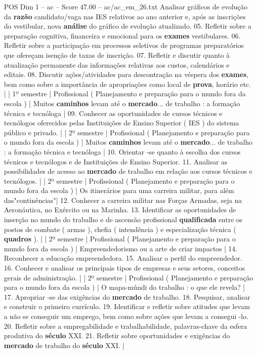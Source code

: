 \begin{textsample}{POS Dim 1 – ac – Score 47.00 – ac/ac\_em\_26.txt}
Analisar gráficos de evolução da \textbf{razão} candidato/vaga nas IES relativos ao ano anterior e, após as inscrições do vestibular, nova \textbf{análise} do gráfico de evolução atualizado. 05.
Refletir sobre a preparação cognitiva, financeira e emocional para os \textbf{exames} vestibulares. 06.
Refletir sobre a participação em processos seletivos de programas preparatórios que ofereçam isenção de taxas de inscrição. 07.
Refletir e discutir quanto à atualização permanente das informações relativas aos custos, calendários e editais. 08.
Discutir ações/atividades para descontração na véspera dos \textbf{exames}, bem como sobre a importância de apropriações como local de \textbf{prova}, horário etc. | | 1º semestre | Profissional ( Planejamento e preparação para o mundo fora da escola ) | Muitos \textbf{caminhos} levam até o \textbf{mercado}... de trabalho : a formação técnica e tecnóloga | 09.
Conhecer as oportunidades de cursos técnicos e tecnólogos oferecidos pelas Instituições de Ensino Superior ( IES ) do sistema público e privado. | | 2º semestre | Profissional ( Planejamento e preparação para o mundo fora da escola ) | Muitos \textbf{caminhos} levam até o \textbf{mercado}... de trabalho : a formação técnica e tecnóloga | 10.
Orientar -se quanto à escolha dos cursos técnicos e tecnólogos e de Instituições de Ensino Superior. 11.
Analisar as possibilidades de acesso ao \textbf{mercado} de trabalho em relação aos cursos técnicos e tecnólogos. | | 2º semestre | Profissional ( Planejamento e preparação para o mundo fora da escola ) | Os itinerários para uma carreira militar, para além das"continências"| 12.
Conhecer a carreira militar nas Forças Armadas, seja na Aeronáutica, no Exército ou na Marinha. 13.
Identificar as oportunidades de inserção no mundo do trabalho e de ascensão profissional \textbf{qualificada} entre os postos de combate ( armas ), chefia ( intendência ) e especialização técnica ( \textbf{quadros} ). | | 2º semestre | Profissional ( Planejamento e preparação para o mundo fora da escola ) | Empreendedorismo ou a arte de criar impactos | 14.
Reconhecer a educação empreendedora. 15.
Analisar o perfil do empreendedor. 16.
Conhecer e analisar os principais tipos de empresas e seus setores, conceitos gerais de administração. | | 2º semestre | Profissional ( Planejamento e preparação para o mundo fora da escola ) | O mapa-múndi do trabalho : o que ele revela? | 17.
Apropriar -se das exigências do \textbf{mercado} de trabalho. 18.
Pesquisar, analisar e construir o primeiro currículo. 19.
Identificar e refletir sobre atitudes que levam a não se conseguir um emprego, bem como sobre ações que levam a consegui -lo. 20.
Refletir sobre a empregabilidade e trabalhabilidade, palavras-chave da esfera produtiva do \textbf{século} XXI. 21.
Refletir sobre oportunidades e exigências do \textbf{mercado} de trabalho do \textbf{século} XXI. |


\end{textsample}
